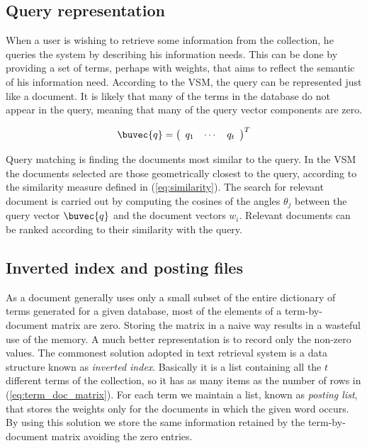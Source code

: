\subsection{Query representation}
When a user is wishing to retrieve some information from the collection, he queries the system by describing his information needs. This can be done by providing a set of terms, perhaps with weights, that aims to reflect the semantic of his information need. According to the VSM, the query can be represented just like a document. It is likely that many of the terms in the database do not appear in the query, meaning that many of the query vector components are zero.

\begin{equation}
\buvec{q} = \left(
\begin{array}{ccc}
   q_1 & \cdots & q_t
\end{array}
\right)^T
\end{equation}

Query matching is finding the documents most similar to the query. In the VSM the documents selected are those geometrically closest to the query, according to the similarity measure defined in (\ref{eq:similarity}). The search for relevant document is carried out by computing the cosines of the angles $\theta_{j}$ between the query vector $\buvec{q}$ and the document vectors $w_i$. Relevant documents can be ranked according to their similarity with the query.

\subsection{Inverted index and posting files}
As a document generally uses only a small subset of the entire dictionary of terms generated for a given database, most of the elements of a term-by-document matrix are zero. Storing the matrix in a naive way results in a wasteful use of the memory. A much better representation is to record only the non-zero values. The commonest solution adopted in text retrieval system is a data structure known as \emph{inverted index}. Basically it is a list containing all the $t$ different terms of the collection, so it has as many items as the number of rows in (\ref{eq:term_doc_matrix}). For each term we maintain a list, known as \emph{posting list}, that stores the weights only for the documents in which the given word occurs. By using this solution we store the same information retained by the term-by-document matrix avoiding the zero entries.

